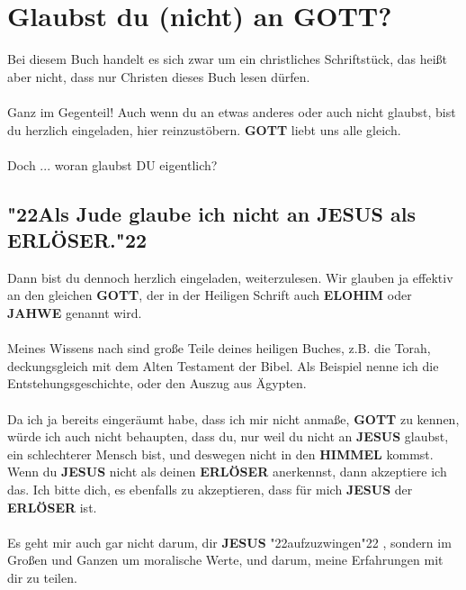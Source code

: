 \documentclass[12pt,a5paper]{article}
\newcommand{\Elohim}[0]{\textbf{ELOHIM}}
\newcommand{\Erloeser}[0]{\textbf{ERL\"OSER}}
\newcommand{\Gott}[0]{\textbf{GOTT}}
\newcommand{\Himmel}[0]{\textbf{HIMMEL}}
\newcommand{\Jahwe}[0]{\textbf{JAHWE}}
\newcommand{\Jesus}[0]{\textbf{JESUS}}
\newcommand{\q}[1]{\char"22{#1}\char"22 }
\begin{document}
	\newpage
	\section{Glaubst du (nicht) an {\Gott}?}
		Bei diesem Buch handelt es sich zwar um ein christliches Schriftst\"uck,
		das hei{\ss}t aber nicht,
		dass nur Christen dieses Buch lesen d\"urfen.
		\\
		\\
		Ganz im Gegenteil!
		Auch wenn du an etwas anderes oder auch nicht glaubst,
		bist du herzlich eingeladen,
		hier reinzust\"obern.
		{\Gott} liebt uns alle gleich.
		\\
		\\
		Doch ... woran glaubst DU eigentlich?
	
	\subsection{\q{Als Jude glaube ich nicht an {\Jesus} als {\Erloeser}.}}
		Dann bist du dennoch herzlich eingeladen,
		weiterzulesen.
		Wir glauben ja effektiv an den gleichen {\Gott},
		der in der Heiligen Schrift auch {\Elohim} oder {\Jahwe} genannt wird.
		\\
		\\
		Meines Wissens nach sind gro{\ss}e Teile deines heiligen Buches,
		z.B. die Torah,
		deckungsgleich mit dem Alten Testament der Bibel.
		Als Beispiel nenne ich die Entstehungsgeschichte,
		oder den Auszug aus \"Agypten.		
		\\
		\\
		Da ich ja bereits einger\"aumt habe,
		dass ich mir nicht anma{\ss}e,
		{\Gott} zu kennen,
		w\"urde ich auch nicht behaupten,
		dass du,
		nur weil du nicht an {\Jesus} glaubst,
		ein schlechterer Mensch bist,
		und deswegen nicht in den {\Himmel} kommst.
		Wenn du {\Jesus} nicht als deinen {\Erloeser} anerkennst,
		dann akzeptiere ich das.
		Ich bitte dich,
		es ebenfalls zu akzeptieren,
		dass f\"ur mich {\Jesus} der {\Erloeser} ist.
		\\
		\\
		Es geht mir auch gar nicht darum,
		dir {\Jesus} \q{aufzuzwingen},
		sondern im Gro{\ss}en und Ganzen um moralische Werte,
		und darum,
		meine Erfahrungen mit dir zu teilen.
		
\end{document}
